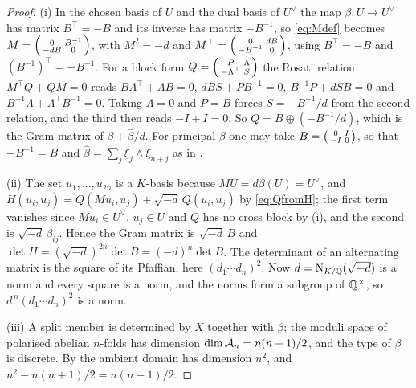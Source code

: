 \begin{proof}
(i) In the chosen basis of $U$ and the dual basis of $U^{\vee}$ the map
$\beta\colon U\to U^{\vee}$ has matrix $B^{\top}=-B$ and its inverse has
matrix $-B^{-1}$, so \eqref{eq:Mdef} becomes
$M=\begin{psmallmatrix}0&B^{-1}\\-dB&0\end{psmallmatrix}$, with
$M^{2}=-d$ and
$M^{\top}=\begin{psmallmatrix}0&dB\\-B^{-1}&0\end{psmallmatrix}$, using
$B^{\top}=-B$ and $(B^{-1})^{\top}=-B^{-1}$. For a block form
$Q=\begin{psmallmatrix}P&\Lambda\\-\Lambda^{\top}&S\end{psmallmatrix}$ the
Rosati relation $M^{\top}Q+QM=0$ reads
$B\Lambda^{\top}+\Lambda B=0$, $dBS+PB^{-1}=0$, $B^{-1}P+dSB=0$ and
$B^{-1}\Lambda+\Lambda^{\top}B^{-1}=0$. Taking $\Lambda=0$ and $P=B$ forces
$S=-B^{-1}/d$ from the second relation, and the third then reads $-I+I=0$.
So $Q=B\oplus(-B^{-1}/d)$, which is the Gram matrix of
$\beta+\widehat\beta/d$. For principal $\beta$ one may take
$B=\begin{psmallmatrix}0&I\\-I&0\end{psmallmatrix}$, so that $-B^{-1}=B$
and $\widehat\beta=\sum_{j}\xi_{j}\wedge\xi_{n+j}$ as in
.

(ii) The set $u_{1},\dots,u_{2n}$ is a $K$-basis because
$MU=d\beta(U)=U^{\vee}$, and $H(u_{i},u_{j})=Q(Mu_{i},u_{j})+\sqrt{-d}\,Q(u_{i},u_{j})$
by \eqref{eq:QfromH}; the first term vanishes since $Mu_{i}\in U^{\vee}$,
$u_{j}\in U$ and $Q$ has no cross block by (i), and the second is
$\sqrt{-d}\,\beta_{ij}$. Hence the Gram matrix is $\sqrt{-d}\,B$ and
$\det H=(\sqrt{-d})^{2n}\det B=(-d)^{n}\det B$. The determinant of an
alternating matrix is the square of its Pfaffian, here $(d_{1}\cdots
d_{n})^{2}$. Now $d=\mathrm{N}_{K/\mathbb{Q}}(\sqrt{-d})$ is a norm and every square is a
norm, and the norms form a subgroup of $\mathbb{Q}^{\times}$, so
$d^{\,n}(d_{1}\cdots d_{n})^{2}$ is a norm.

(iii) A split member is determined by $X$ together with $\beta$; the moduli
space of polarised abelian $n$-folds has dimension $\dim\mathcal{A}_{n}=n(n+1)/2$,
and the type of $\beta$ is discrete. By  the ambient domain has
dimension $n^{2}$, and $n^{2}-n(n+1)/2=n(n-1)/2$.


\end{proof}
